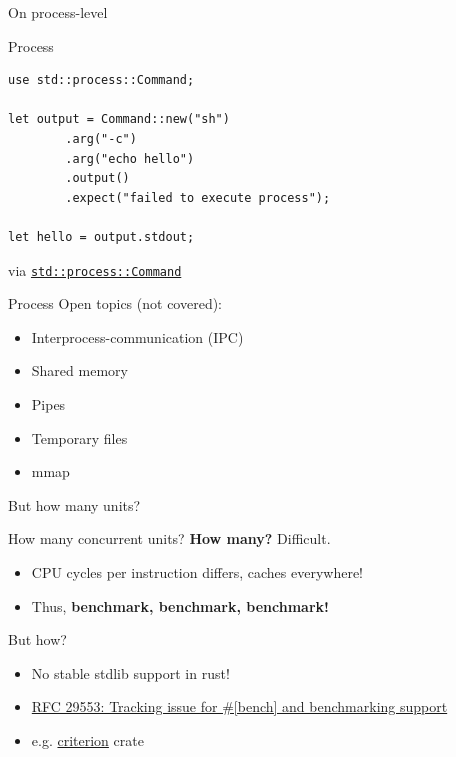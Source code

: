 \documentclass{beamer}
\begin{document}
\begin{frame}[standout]
  On process-level
\end{frame}

\begin{frame}[fragile]{Process}
  \begin{verbatim}
use std::process::Command;

let output = Command::new("sh")
        .arg("-c")
        .arg("echo hello")
        .output()
        .expect("failed to execute process");

let hello = output.stdout;
  \end{verbatim}

  via \href{https://doc.rust-lang.org/std/process/struct.Command.html}{\texttt{std::process::Command}}
\end{frame}

\begin{frame}[fragile]{Process}
  Open topics (not covered):

  \begin{itemize}
    \item Interprocess-communication (IPC)
    \item Shared memory
    \item Pipes
    \item Temporary files
    \item mmap
  \end{itemize}
\end{frame}

\begin{frame}[standout]
  But how many units?
\end{frame}

\begin{frame}[fragile]{How many concurrent units?}
  \textbf{How many?} Difficult.
  \begin{itemize}
    \item CPU cycles per instruction differs, caches everywhere!
    \item Thus, \textbf{benchmark, benchmark, benchmark!}
  \end{itemize}
  But how?
  \begin{itemize}
    \item No stable stdlib support in rust!
    \item \href{https://github.com/rust-lang/rust/issues/29553}{RFC 29553: Tracking issue for #[bench] and benchmarking support}
    \item e.g. \href{https://crates.io/crates/criterion}{criterion} crate
  \end{itemize}
\end{frame}
\end{document}
